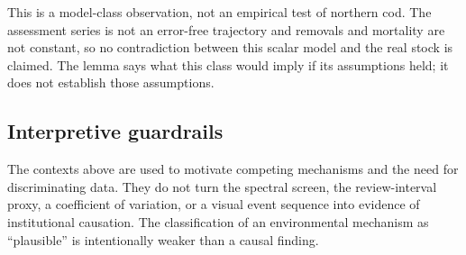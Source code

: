 This is a model-class observation, not an empirical test of northern cod. The assessment series is not an error-free trajectory and removals and mortality are not constant, so no contradiction between this scalar model and the real stock is claimed. The lemma says what this class would imply if its assumptions held; it does not establish those assumptions.

\subsection{Interpretive guardrails}

The contexts above are used to motivate competing mechanisms and the need for discriminating data. They do not turn the spectral screen, the review-interval proxy, a coefficient of variation, or a visual event sequence into evidence of institutional causation. The classification of an environmental mechanism as ``plausible'' is intentionally weaker than a causal finding.

